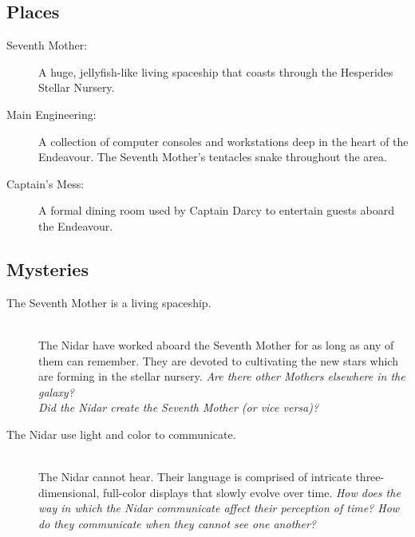 \documentclass[11pt, a5paper, parskip=half-, DIV=12]{scrartcl}
\begin{document}
\subsection*{Places}
\begin{description}
	\item[Seventh Mother:] A huge, jellyfish-like living spaceship that coasts through the Hesperides Stellar Nursery.
	\item[Main Engineering:] A collection of computer consoles and workstations deep in the heart of the Endeavour. The Seventh Mother's tentacles snake throughout the area.
	\item[Captain's Mess:] A formal dining room used by Captain Darcy to entertain guests aboard the Endeavour.
\end{description}

\subsection*{Mysteries}
\begin{description}
	\item[The Seventh Mother is a living spaceship.] \phantom{} \\ The Nidar have worked aboard the Seventh Mother for as long as any of them can remember. They are devoted to cultivating the new stars which are forming in the stellar nursery.  \textit{Are there other Mothers elsewhere in the galaxy? \\ Did the Nidar create the Seventh Mother (or vice versa)?}
	\item[The Nidar use light and color to communicate.] \phantom{a} \\ The Nidar cannot hear. Their language is comprised of intricate three-dimensional, full-color displays that slowly evolve over time. \textit{How does the way in which the Nidar communicate affect their perception of time? How do they communicate when they cannot see one another?}
\end{description}

\newpage



\newpage

\thispagestyle{empty}
\end{document}
